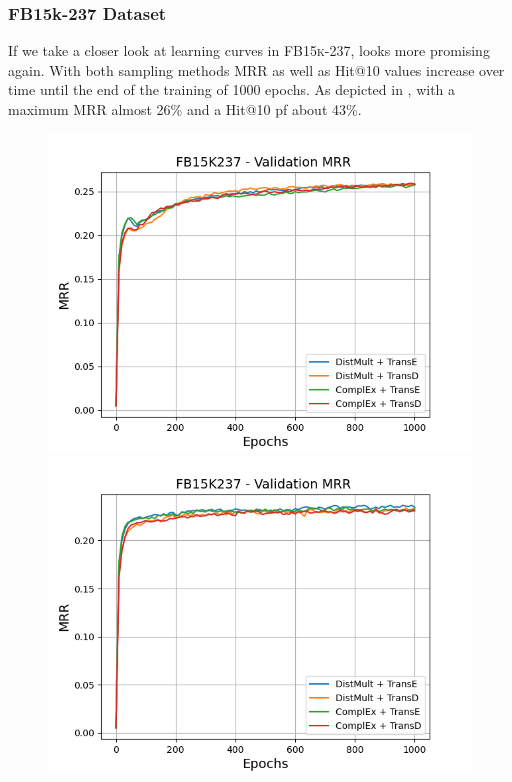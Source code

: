 \subsubsection{FB15k-237 Dataset}
\label{subsubsec:uncertainty_fb15k237}
%
If we take a closer look at learning curves in \textsc{FB15k-237}, \ussoftmax looks more promising again.
With both sampling methods MRR as well as Hit@10 values increase over time until the end of the training of 1000 epochs.
As depicted in , with \origsampling a maximum MRR almost 26\% and a Hit@10 pf about 43\%.
\begin{figure}
    \centering
    \begin{minipage}{.5\textwidth}
      \centering
      \includegraphics[width=0.9\linewidth]{figures/results/gan_train/not_pretrained/random/fb15k237/epochs1000/random_fb15k237_mrrs.png}
    \end{minipage}%
    \begin{minipage}{.5\textwidth}
      \centering
      \includegraphics[width=0.9\linewidth]{figures/results/gan_train/not_pretrained/uncertainty/max_distribution/entropy/fb15k237/1k_epochs/uncertainty_fb15k237_mrrs.png}

\end{minipage}
\end{figure}
